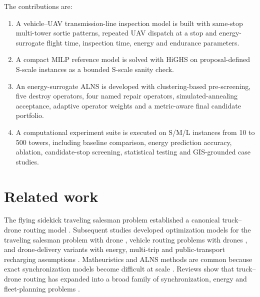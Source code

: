 \documentclass[preprint,12pt,number]{elsarticle}
\newcommand{\rev}[1]{{\color{blue}#1}}
\begin{document}
The contributions are:
\begin{enumerate}
    \item \rev{A vehicle--UAV transmission-line inspection model is built with same-stop multi-tower sortie patterns, repeated UAV dispatch at a stop and energy-surrogate flight time, inspection time, energy and endurance parameters.}
    \item A compact MILP reference model is solved with HiGHS on proposal-defined S-scale instances as a bounded S-scale sanity check.
    \item \rev{An energy-surrogate ALNS is developed with clustering-based pre-screening, five destroy operators, four named repair operators, simulated-annealing acceptance, adaptive operator weights and a metric-aware final candidate portfolio.}
    \item \rev{A computational experiment suite is executed on S/M/L instances from 10 to 500 towers, including baseline comparison, energy prediction accuracy, ablation, candidate-stop screening, statistical testing and GIS-grounded case studies.}
\end{enumerate}

\section{Related work}
\label{sec:related}

The flying sidekick traveling salesman problem established a canonical truck--drone routing model \cite{murray2015flying}. Subsequent studies developed optimization models for the traveling salesman problem with drone \cite{agatz2018tspdrone,poikonen2019branch,roberti2021exact}, vehicle routing problems with drones \cite{poikonen2017extended,wang2017worstcase,wang2019vrpd}, and drone-delivery variants with energy, multi-trip and public-transport recharging assumptions \cite{dorling2017vehicle,moadab2022drone,asoc2023recharging}. Matheuristics and ALNS methods are common because exact synchronization models become difficult at scale \cite{schermer2019matheuristic,sacramento2019alns}. Reviews show that truck--drone routing has expanded into a broad family of synchronization, energy and fleet-planning problems \cite{otto2018survey,macrina2020review,liang2022survey}.
\end{document}
